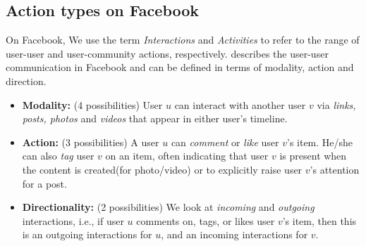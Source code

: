 \subsection{Action types on Facebook}
On Facebook, We use the term {\em Interactions} and {\em Activities} to refer to the range of user-user and user-community actions, respectively.
 describes the user-user communication in Facebook and can be defined in terms of modality, action and direction.
\begin{itemize}
\item \textbf{Modality:} (4 possibilities)
User $u$ can interact with another user $v$ via \textit{links, posts, photos} and \textit{videos} that appear in either user's timeline.

\item \textbf{Action:} (3 possibilities)
A user $u$ can \textit{comment} or \textit{like} 
user $v$'s item. He/she can also \textit{tag} user $v$ on an 
item, often indicating that user $v$ is present when the content is created(for photo/video)
or to explicitly raise user $v$'s attention for a post.

\item \textbf{Directionality:} (2 possibilities)
We look at \textit{incoming} and \textit{outgoing} interactions, i.e.,
if user $u$ comments on, tags, or likes user $v$'s item,
then this is an outgoing interactions for $u$, and an incoming interactions for $v$.
      								
\end{itemize}

